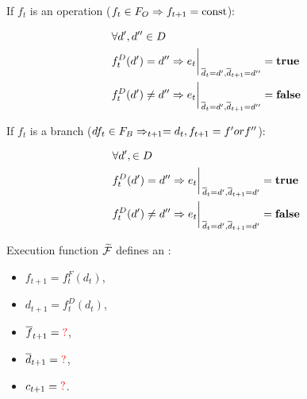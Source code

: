 If $f_t$ is an operation ($f_t \in F_O \Rightarrow f_{t + 1} = \text{const}$):


\begin{align}
    & \forall d', d'' \in D \,\, \\
    & f_t^D(d') = d'' \Rightarrow e_t \bigg\rvert_{
        \, \overline{d}_t = d', \overline{d}_{t + 1} = d''} = \textbf{true} \\
    & f_t^D(d') \neq d'' \Rightarrow e_t \bigg\rvert_{
        \, \overline{d}_t = d', \overline{d}_{t + 1} = d''} = \textbf{false}
\end{align}

If $f_t$ is a branch
($df_t \in F_B \Rightarrow _{t + 1} = d_t, f_{t + 1} = f' or f ''$):

\begin{align}
    & \forall d', \in D \,\, \\
    & f_t^D(d') = d'' \Rightarrow e_t \bigg\rvert_{
        \, \overline{d}_t = d', \overline{d}_{t + 1} = d'} = \textbf{true} \\
    & f_t^D(d') \neq d'' \Rightarrow e_t \bigg\rvert_{
        \, \overline{d}_t = d', \overline{d}_{t + 1} = d'} = \textbf{false}
\end{align}

Execution function $\widetilde{\mathcal{F}}$ defines an :
\begin{itemize}
    \item $f_{t + 1} = f_t^F(d_t)$,
    \item $d_{t + 1} = f_t^D(d_t)$,
    \item $\overline{f}_{t + 1} = \textcolor{red}{?}$,
    \item $\overline{d}_{t + 1} = \textcolor{red}{?}$,
    \item $c_{t + 1} = \textcolor{red}{?}$.
\end{itemize}

